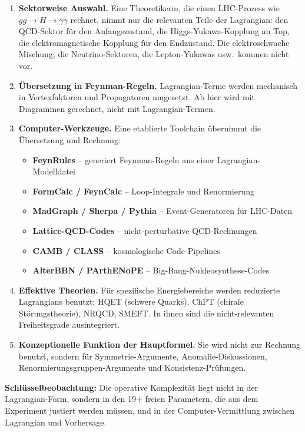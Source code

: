 \documentclass[11pt,a4paper]{article}
\begin{document}
\begin{enumerate}\itemsep2pt
\item \textbf{Sektorweise Auswahl.} Eine Theoretikerin, die einen LHC-Prozess wie $gg \to H \to \gamma\gamma$ rechnet, nimmt nur die relevanten Teile der Lagrangian: den QCD-Sektor für den Anfangszustand, die Higgs-Yukawa-Kopplung an Top, die elektromagnetische Kopplung für den Endzustand. Die elektroschwache Mischung, die Neutrino-Sektoren, die Lepton-Yukawas usw.\ kommen nicht vor.

\item \textbf{Übersetzung in Feynman-Regeln.} Lagrangian-Terme werden mechanisch in Vertexfaktoren und Propagatoren umgesetzt. Ab hier wird mit Diagrammen gerechnet, nicht mit Lagrangian-Termen.

\item \textbf{Computer-Werkzeuge.} Eine etablierte Toolchain übernimmt die Übersetzung und Rechnung:
\begin{itemize}\itemsep1pt
\item \textbf{FeynRules} -- generiert Feynman-Regeln aus einer Lagrangian-Modelldatei
\item \textbf{FormCalc / FeynCalc} -- Loop-Integrale und Renormierung
\item \textbf{MadGraph / Sherpa / Pythia} -- Event-Generatoren für LHC-Daten
\item \textbf{Lattice-QCD-Codes} -- nicht-perturbative QCD-Rechnungen
\item \textbf{CAMB / CLASS} -- kosmologische Code-Pipelines
\item \textbf{AlterBBN / PArthENoPE} -- Big-Bang-Nukleosynthese-Codes
\end{itemize}

\item \textbf{Effektive Theorien.} Für spezifische Energiebereiche werden reduzierte Lagrangians benutzt: HQET (schwere Quarks), ChPT (chirale Störungstheorie), NRQCD, SMEFT. In ihnen sind die nicht-relevanten Freiheitsgrade ausintegriert.

\item \textbf{Konzeptionelle Funktion der Hauptformel.} Sie wird nicht zur Rechnung benutzt, sondern für Symmetrie-Argumente, Anomalie-Diskussionen, Renormierungsgruppen-Argumente und Konsistenz-Prüfungen.
\end{enumerate}

\textbf{Schlüsselbeobachtung:} Die operative Komplexität liegt nicht in der Lagrangian-Form, sondern in den 19+ freien Parametern, die aus dem Experiment justiert werden müssen, und in der Computer-Vermittlung zwischen Lagrangian und Vorhersage.
\end{document}
